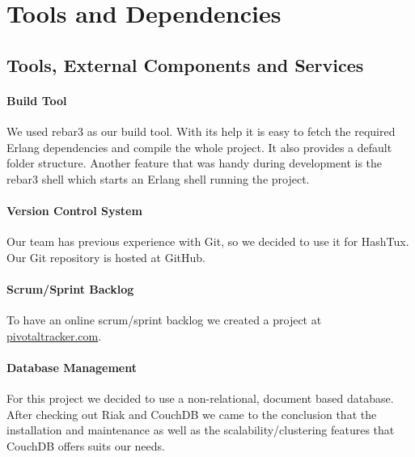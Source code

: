 \label{toolsanddeps}
\chapter{Tools and Dependencies}

\section{Tools, External Components and Services}

\subsubsection{Build Tool}
We used rebar3 as our build tool. With its help it is easy to fetch the required
Erlang dependencies and compile the whole project. It also provides a default
folder structure. Another feature that was handy during development is the
rebar3 shell which starts an Erlang shell running the project.

\subsubsection{Version Control System}
Our team has previous experience with Git, so we decided to use it for HashTux.
Our Git repository is hosted at GitHub.

\subsubsection{Scrum/Sprint Backlog}
To have an online scrum/sprint backlog we created a project at \newline
\href{http://www.pivotaltracker.com}{pivotaltracker.com}.

\subsubsection{Database Management}
For this project we decided to use a non-relational, document based database.
After checking out Riak and CouchDB we came to the conclusion that the
installation and maintenance as well as the scalability/clustering features that
CouchDB offers suits our needs.

